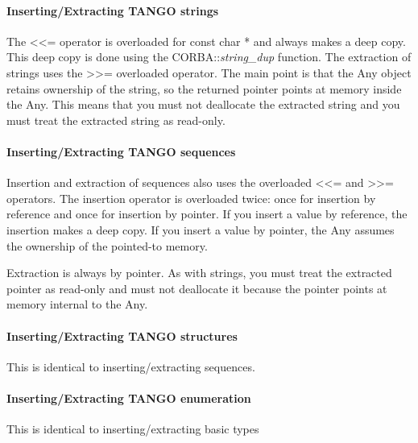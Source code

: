\paragraph{Inserting/Extracting TANGO strings}

The <\textcompwordmark{}<= operator is overloaded for const char {*}
and always makes a deep copy. This deep copy is done using the CORBA::\emph{string\_dup}
function. The extraction of strings uses the >\textcompwordmark{}>=
overloaded operator. The main point is that the Any object
retains ownership of the string, so the returned pointer points at
memory inside the Any. This means that you must not
deallocate the extracted string and you must treat the extracted string
as read-only.


\paragraph{Inserting/Extracting TANGO sequences}

Insertion and extraction of sequences also uses the
overloaded <\textcompwordmark{}<= and >\textcompwordmark{}>= operators.
The insertion operator is overloaded twice: once for insertion by
reference and once for insertion by pointer. If you insert a value
by reference, the insertion makes a deep copy. If you insert a value
by pointer, the Any assumes the ownership of the pointed-to
memory. 

Extraction is always by pointer. As with strings, you must treat the
extracted pointer as read-only and must not deallocate it because
the pointer points at memory internal to the Any.


\paragraph{Inserting/Extracting TANGO structures}

This is identical to inserting/extracting sequences.


\paragraph{Inserting/Extracting TANGO enumeration}

This is identical to inserting/extracting basic types


